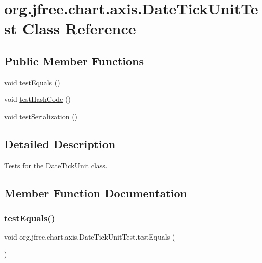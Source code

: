 \hypertarget{classorg_1_1jfree_1_1chart_1_1axis_1_1_date_tick_unit_test}{}\section{org.\+jfree.\+chart.\+axis.\+Date\+Tick\+Unit\+Test Class Reference}
\label{classorg_1_1jfree_1_1chart_1_1axis_1_1_date_tick_unit_test}
\subsection*{Public Member Functions}
\begin{DoxyCompactItemize}
\item 
void \mbox{\hyperlink{classorg_1_1jfree_1_1chart_1_1axis_1_1_date_tick_unit_test_acb9fb76c482a0462efab7629f2c09550}{test\+Equals}} ()
\item 
void \mbox{\hyperlink{classorg_1_1jfree_1_1chart_1_1axis_1_1_date_tick_unit_test_a70aa72f8867a295f1d6f5606e1721abc}{test\+Hash\+Code}} ()
\item 
void \mbox{\hyperlink{classorg_1_1jfree_1_1chart_1_1axis_1_1_date_tick_unit_test_abaae589fe368df1d4e888e79955f4bfd}{test\+Serialization}} ()
\end{DoxyCompactItemize}


\subsection{Detailed Description}
Tests for the \mbox{\hyperlink{classorg_1_1jfree_1_1chart_1_1axis_1_1_date_tick_unit}{Date\+Tick\+Unit}} class. 

\subsection{Member Function Documentation}
\mbox{\label{classorg_1_1jfree_1_1chart_1_1axis_1_1_date_tick_unit_test_acb9fb76c482a0462efab7629f2c09550}} 
\subsubsection{\texorpdfstring{test\+Equals()}{testEquals()}}
{\footnotesize\ttfamily void org.\+jfree.\+chart.\+axis.\+Date\+Tick\+Unit\+Test.\+test\+Equals (\begin{DoxyParamCaption}{ }\end{DoxyParamCaption})}

